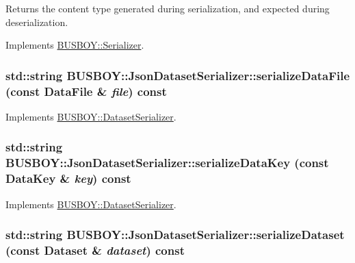 Returns the content type generated during serialization, and expected during deserialization. 

Implements \hyperlink{classBUSBOY_1_1Serializer_aadfd0df50149a0c59424b5910c5ae3ef}{BUSBOY::Serializer}.\hypertarget{classBUSBOY_1_1JsonDatasetSerializer_adc5513d517be053ec289589702f5a599}{
\subsubsection[{serializeDataFile}]{\setlength{\rightskip}{0pt plus 5cm}std::string BUSBOY::JsonDatasetSerializer::serializeDataFile (const {\bf DataFile} \& {\em file}) const}}
\label{classBUSBOY_1_1JsonDatasetSerializer_adc5513d517be053ec289589702f5a599}


Implements \hyperlink{classBUSBOY_1_1DatasetSerializer_ab9b56a991074a0abb0ab94d2a409c6bf}{BUSBOY::DatasetSerializer}.\hypertarget{classBUSBOY_1_1JsonDatasetSerializer_ac4888a2de49c410d35b77e5d4d6ed04a}{
\subsubsection[{serializeDataKey}]{\setlength{\rightskip}{0pt plus 5cm}std::string BUSBOY::JsonDatasetSerializer::serializeDataKey (const {\bf DataKey} \& {\em key}) const}}
\label{classBUSBOY_1_1JsonDatasetSerializer_ac4888a2de49c410d35b77e5d4d6ed04a}


Implements \hyperlink{classBUSBOY_1_1DatasetSerializer_ae6feb1fca82e563d82a07722b4cc1999}{BUSBOY::DatasetSerializer}.\hypertarget{classBUSBOY_1_1JsonDatasetSerializer_add2bc8fa98d80ed23fd782af66ad9ef2}{
\subsubsection[{serializeDataset}]{\setlength{\rightskip}{0pt plus 5cm}std::string BUSBOY::JsonDatasetSerializer::serializeDataset (const {\bf Dataset} \& {\em dataset}) const}}
\label{classBUSBOY_1_1JsonDatasetSerializer_add2bc8fa98d80ed23fd782af66ad9ef2}


